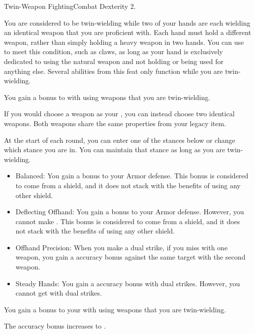   \begin{feat}{Twin-Weapon Fighting}{Combat}
    \featpre Dexterity 2.

     You are considered to be twin-wielding while two of your hands are each wielding an identical weapon that you are proficient with.
    Each hand must hold a different weapon, rather than simply holding a heavy weapon in two hands.
    You can use  to meet this condition, such as claws, as long as your hand is exclusively dedicated to using the natural weapon and not holding or being used for anything else.
    Several abilities from this feat only function while you are twin-wielding.

     You gain a  bonus to  with  using weapons that you are twin-wielding.

     If you would choose a weapon as your , you can instead choose two identical weapons.
    Both weapons share the same properties from your legacy item.

     At the start of each round, you can enter one of the stances below or change which stance you are in.
    You can maintain that stance as long as you are twin-wielding.
    \begin{itemize}
      \item Balanced: You gain a  bonus to your Armor defense.
        This bonus is considered to come from a shield, and it does not stack with the benefits of using any other shield.
      \item Deflecting Offhand: You gain a  bonus to your Armor defense.
        However, you cannot make .
        This bonus is considered to come from a shield, and it does not stack with the benefits of using any other shield.
      \item Offhand Precision: When you make a dual strike, if you miss with one weapon, you gain a  accuracy bonus against the same target with the second weapon.
      \item Steady Hands: You gain a  accuracy bonus with dual strikes.
        However, you cannot get  with dual strikes.
    \end{itemize}

     You gain a  bonus to your  with  using weapons that you are twin-wielding.

     The accuracy bonus increases to .
  \end{feat}

